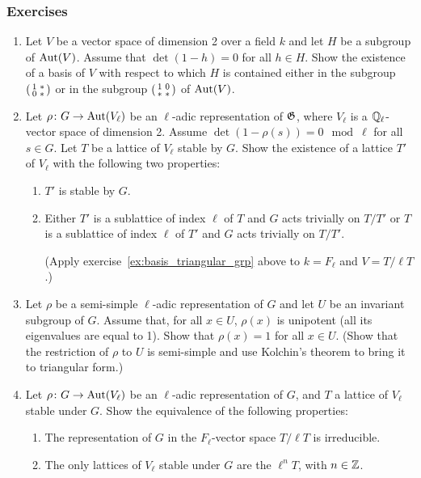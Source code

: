 \subsubsection*{Exercises}
\begin{enumerate}
	\item\label{ex:basis_triangular_grp}
		Let $V$ be a vector space of dimension 2 over a field $k$ and
		let $H$ be a subgroup of $\operatorname{Aut}(V)$. Assume that $\det(1-h) = 0$
		for all $h \in H$. Show the existence of a basis of $V$ with
		respect to which $H$ is contained either in the subgroup $
		\begin{psmallmatrix}
			1 & * \\
			0 & *
		\end{psmallmatrix}
		$ or in the subgroup $
		\begin{psmallmatrix}
			1 & 0 \\
			* & *
		\end{psmallmatrix}
		$ of $\operatorname{Aut}(V)$.
	\item\label{ex:I11_ex2}
		Let $\rho \colon G \to \operatorname{Aut}(V_\ell)$ be an $\ell$-adic
		representation of $\mathfrak{G}$, where $V_\ell$ is a $\mathbb{Q}_\ell$-vector
		space of dimension 2. Assume $\det(1-\rho(s))= 0 \mod\ell$ for
		all $s \in G$. Let $T$ be a lattice of $V_\ell$ stable by $G$.
		Show the existence of a lattice $T'$ of $V_\ell$ with the
		following two properties:
	\begin{enumerate}
		\item $T'$ is stable by $G$.
		\item Either $T'$ is a sublattice of index $\ell$ of $T$ and
			\dpage
			$G$ acts trivially on $T/T'$ or $T$ is a sublattice of
			index $\ell$ of $T'$ and $G$ acts trivially on $T/T'$.
			\label{errata:t't}

			(Apply exercise~\ref{ex:basis_triangular_grp} above to
			$k = F_\ell$ and $V = T/\ell T$.)

	\end{enumerate}
	\item Let $\rho$ be a semi-simple $\ell$-adic representation of $G$ and
		let $U$ be an invariant subgroup of $G$.  Assume that, for all
		$x \in U$, $\rho(x)$ is unipotent (all its eigenvalues are
		equal to 1). Show that $\rho(x) = 1$ for all $x \in U$. (Show
		that the restriction of $\rho$ to $U$ is semi-simple and use
		Kolchin's theorem to bring it to triangular form.)
	\item Let $\rho \colon G \to \operatorname{Aut}(V_\ell)$ be an $\ell$-adic
		representation of $G$, and $T$ a lattice of $V_\ell$ stable
		under $G$. Show the equivalence of the following properties:
	\begin{enumerate}
		\item The representation of $G$ in the $F_\ell$-vector space
			$T/\ell T$ is irreducible.
		\item The only lattices of $V_\ell$ stable under $G$ are the
			$\ell^n T$, with $n \in \mathbb{Z}$.
	\end{enumerate}
\end{enumerate}

